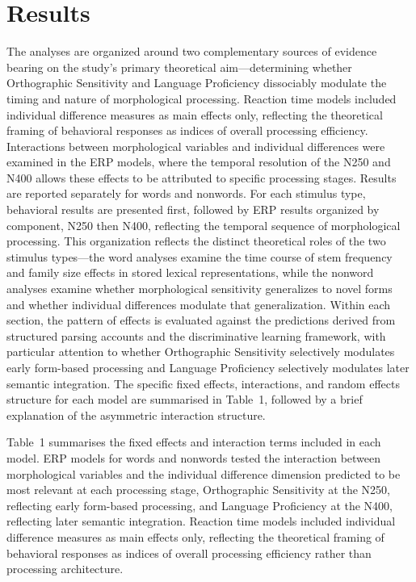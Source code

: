 \documentclass[utf8]{FrontiersinHarvard} %
\begin{document}
\section{Results}

The analyses are organized around two complementary sources of evidence bearing on the study's primary theoretical aim—determining whether Orthographic Sensitivity and Language Proficiency dissociably modulate the timing and nature of morphological processing. Reaction time models included individual difference measures as main effects only, reflecting the theoretical framing of behavioral responses as indices of overall processing efficiency. Interactions between morphological variables and individual differences were examined in the ERP models, where the temporal resolution of the N250 and N400 allows these effects to be attributed to specific processing stages. Results are reported separately for words and nonwords. For each stimulus type, behavioral results are presented first, followed by ERP results organized by component, N250 then N400, reflecting the temporal sequence of morphological processing. This organization reflects the distinct theoretical roles of the two stimulus types—the word analyses examine the time course of stem frequency and family size effects in stored lexical representations, while the nonword analyses examine whether morphological sensitivity generalizes to novel forms and whether individual differences modulate that generalization. Within each section, the pattern of effects is evaluated against the predictions derived from structured parsing accounts and the discriminative learning framework, with particular attention to whether Orthographic Sensitivity selectively modulates early form-based processing and Language Proficiency selectively modulates later semantic integration. The specific fixed effects, interactions, and random effects structure for each model are summarised in Table~1, followed by a brief explanation of the asymmetric interaction structure.

Table~1 summarises the fixed effects and interaction terms included in each model. ERP models for words and nonwords tested the interaction between morphological variables and the individual difference dimension predicted to be most relevant at each processing stage, Orthographic Sensitivity at the N250, reflecting early form-based processing, and Language Proficiency at the N400, reflecting later semantic integration. Reaction time models included individual difference measures as main effects only, reflecting the theoretical framing of behavioral responses as indices of overall processing efficiency rather than processing architecture.
\end{document}
